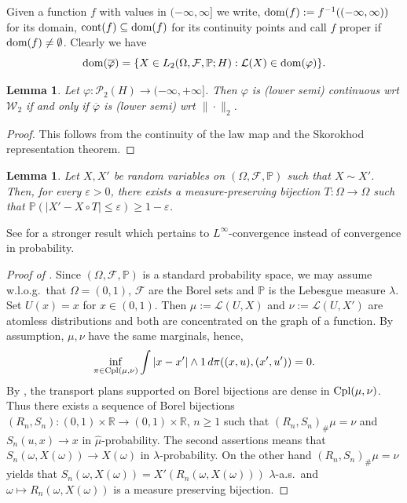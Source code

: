 \documentclass[a4paper]{amsart}
\numberwithin{theorem}{section}
\newtheorem{lemma}[theorem]{Lemma}
\theoremstyle{definition}
\newcommand{\R}{\mathbb{R}}
\newcommand{\F}{\mathcal{F}}
\newcommand{\law}{\mathcal{L}}
\newcommand{\dom}{\textup{dom}}
\newcommand{\cpl}{\textup{Cpl}}
\newcommand{\W}{\mathcal{W}}
\newcommand{\Pc}{\mathcal P}
\renewcommand{\epsilon}{\varepsilon}
\renewcommand{\P}{\mathbb{P}}
\newcommand{\cont}{\textup{cont}}
\renewcommand{\H}{H}
\renewcommand{\phi}{\varphi}
\begin{document}
Given a function $f $ with values in $(-\infty, \infty]$ we write, $\dom (f) := f^{-1}((-\infty, \infty)) $ for its domain, $\cont (f)\subseteq \dom (f) $ for its continuity points and call $f$ proper if $\dom (f) \neq \emptyset$. Clearly we have
\[
\dom(\overline{\phi}) = \{ X \in L_2(\Omega,\F,\P;\H) : \law(X) \in \dom(\phi) \}. 
\]





\begin{lemma}\label{lem:contequiv}
Let $\phi : \Pc_2(\H) \to (-\infty, +\infty]$. Then $\phi$ is (lower semi) continuous wrt $\W_2$ if and only if $\overline{\phi}$ is (lower semi) wrt $\| \cdot \|_2$. 
\end{lemma}
\begin{proof}
This follows from the continuity of the law map and the Skorokhod representation theorem.     
\end{proof}




\begin{lemma}\label{lem:simple_transfer}
    Let $X,X'$ be random variables on $(\Omega,\F,\P)$  such that $X \sim X'$.
    Then, for every $\epsilon > 0$, there exists a measure-preserving bijection $T : \Omega \to \Omega$ such that $\mathbb P(|X' - X \circ T| \le \epsilon) \ge 1 - \epsilon$.
\end{lemma}

See  \cite[Lemma 5.23]{CaDe18} for a  stronger result which pertains to $L^\infty$-convergence instead of convergence in probability. 


\begin{proof}[Proof of ]
    Since $(\Omega,\F,\P)$ is a standard probability space, we may assume w.l.o.g.\ that  $\Omega=(0,1)$, $\F$ are the Borel sets  and $\P$ is the Lebesgue measure $\lambda$. Set $U(x)=x$ for $x\in (0,1)$.
    Then $ \mu := \law(U,X)$ and $\nu := \law(U,X')$ are atomless distributions and both are concentrated on the graph of a function. By assumption, $\mu, \nu$ have the same marginals, hence,
    \[
        \inf_{\pi \in \cpl(\mu,\nu)} \int |x-x'| \wedge 1 \, d\pi((x,u),(x',u')) = 0.
    \]
    By \cite{Ga99}, the transport plans supported on Borel bijections are dense in $\cpl(\mu, \nu)$. Thus there exists a sequence of Borel bijections $(R_n,S_n) :  (0,1)\times \R \to (0,1) \times \R$, $n\geq 1$ such that $(R_n, S_n)_\# \mu = \nu$ and $S_n(u,x)\to x$ in $\hat \mu$-probability. The second assertions means that $S_n(\omega, X(\omega)) \to  X(\omega)$ in $\lambda$-probability. On the other hand $(R_n, S_n)_\#  \mu =  \nu$ yields that $S_n(\omega, X(\omega)) = X'(R_n(\omega, X(\omega)))$
    $\lambda$-a.s.\ and $\omega \mapsto R_n(\omega,X(\omega))$ is a measure preserving bijection. 
\end{proof}
\end{document}
